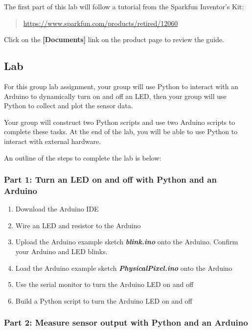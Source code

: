 \documentclass[11pt]{article}
\begin{document}
The first part of this lab will follow a tutorial from the Sparkfun
Inventor's Kit:

\begin{quote}
\url{https://www.sparkfun.com/products/retired/12060}
\end{quote}

Click on the \textbf{{[}Documents{]}} link on the product page to review
the guide.

    \hypertarget{lab}{%
\subsection{Lab}\label{lab}}

For this group lab assignment, your group will use Python to interact
with an Arduino to dynamically turn on and off an LED, then your group
will use Python to collect and plot the sensor data.

Your group will construct two Python scripts and use two Arduino scripts
to complete these tasks. At the end of the lab, you will be able to use
Python to interact with external hardware.

    An outline of the steps to complete the lab is below:

\hypertarget{part-1-turn-an-led-on-and-off-with-python-and-an-arduino}{%
\subsubsection{Part 1: Turn an LED on and off with Python and an
Arduino}\label{part-1-turn-an-led-on-and-off-with-python-and-an-arduino}}

\begin{enumerate}
\def\labelenumi{(\alph{enumi})}
\item
  Download the Arduino IDE
\item
  Wire an LED and resistor to the Arduino
\item
  Upload the Arduino example sketch \textbf{\emph{blink.ino}} onto the
  Arduino. Confirm your Arduino and LED blinks.
\item
  Load the Arduino example sketch \textbf{\emph{PhysicalPixel.ino}} onto
  the Arduino
\item
  Use the serial monitor to turn the Arduino LED on and off
\item
  Build a Python script to turn the Arduino LED on and off
\end{enumerate}

    \hypertarget{part-2-measure-sensor-output-with-python-and-an-arduino}{%
\subsubsection{Part 2: Measure sensor output with Python and an
Arduino}\label{part-2-measure-sensor-output-with-python-and-an-arduino}}
\end{document}

